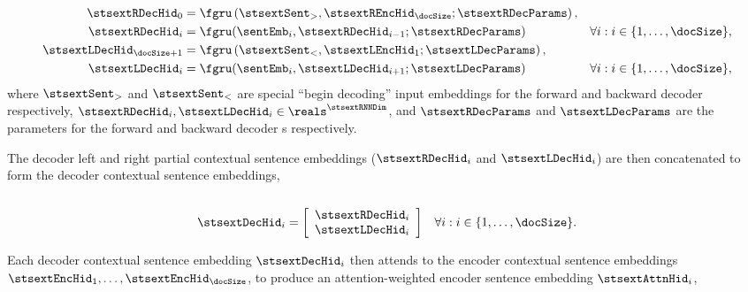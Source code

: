 \noindent{}\\[-40pt]
\begin{align}
\stsextRDecHid_0 & = \fgru\left(\stsextSent_>,   \stsextREncHid_\docSize; \stsextRDecParams\right),\\ 
        \stsextRDecHid_i & = \fgru(
            \sentEmb_i,  \stsextRDecHid_{i-1}; 
            \stsextRDecParams) &
    \forall i : i \in \{1,\ldots,\docSize\}, \\
\stsextLDecHid_{\docSize+1} & = \fgru\left(\stsextSent_<, \stsextLEncHid_1;\stsextLDecParams\right),\\ 
        \stsextLDecHid_i & = \fgru(
            \sentEmb_i,  \stsextLDecHid_{i+1}; 
            \stsextLDecParams) &
    \forall i : i \in \{1,\ldots,\docSize\}, 
\end{align}
where $\stsextSent_>$ and $\stsextSent_<$ are special ``begin decoding'' input
embeddings for the forward and backward decoder respectively,
$\stsextRDecHid_i, \stsextLDecHid_i \in \reals^{\stsextRNNDim}$, and
$\stsextRDecParams$ and $\stsextLDecParams$ are the parameters for the forward
and backward decoder \gru s respectively.

The decoder left and right partial contextual sentence embeddings
($\stsextRDecHid_i$ and $\stsextLDecHid_i$) are then concatenated to form the
decoder contextual sentence embeddings,\\

\noindent{}\\[-20pt]
\begin{align}
        \stsextDecHid_i & = \left[\begin{array}{c}
            \stsextRDecHid_i\\ 
            \stsextLDecHid_i\end{array}\right] &
    \forall i :  i \in \{1,\ldots,\docSize\}.
\end{align}




\clearpage

Each decoder contextual sentence embedding $\stsextDecHid_i$ then attends to
the encoder contextual sentence embeddings $\stsextEncHid_1,\ldots,
\stsextEncHid_\docSize$, to produce an attention-weighted encoder sentence
embedding $\stsextAttnHid_i$,\\
    
